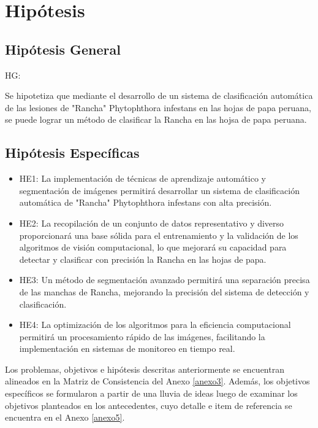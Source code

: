 \section{Hipótesis}

\subsection{Hipótesis General}
HG: \newcommand{\HipotesisGeneral}{
Se hipotetiza que mediante el desarrollo de un sistema de clasificación automática de las lesiones de "Rancha" Phytophthora infestans en las hojas de papa peruana, se puede lograr un método de clasificar la Rancha en las hojsa de papa peruana.
}
\HipotesisGeneral
\subsection{Hipótesis Específicas}
\newcommand{\Hone}{
La implementación de técnicas de aprendizaje automático y segmentación de imágenes permitirá desarrollar un sistema de clasificación automática de "Rancha" Phytophthora infestans con alta precisión.
}
\newcommand{\Htwo}{
La recopilación de un conjunto de datos representativo y diverso proporcionará una base sólida para el entrenamiento y la validación de los algoritmos de visión computacional, lo que mejorará su capacidad para detectar y clasificar con precisión la Rancha en las hojas de papa.
}
\newcommand{\Hthree}{
 Un método de segmentación avanzado permitirá una separación precisa de las manchas de Rancha, mejorando la precisión del sistema de detección y clasificación.
}
\newcommand{\Hfour}{
 La optimización de los algoritmos para la eficiencia computacional permitirá un procesamiento rápido de las imágenes, facilitando la implementación en sistemas de monitoreo en tiempo real.
}

\begin{itemize}
	\item HE1: \Hone
	\item HE2: \Htwo
	\item HE3: \Hthree
	\item HE4: \Hfour
\end{itemize}

Los problemas, objetivos e hipótesis descritas anteriormente se encuentran alineados en la Matriz de Consistencia del Anexo \ref{anexo3}. Además, los objetivos específicos se formularon a partir de una lluvia de ideas luego de examinar los objetivos planteados en los antecedentes, cuyo detalle e item de referencia se encuentra en el Anexo \ref{anexo5}.

